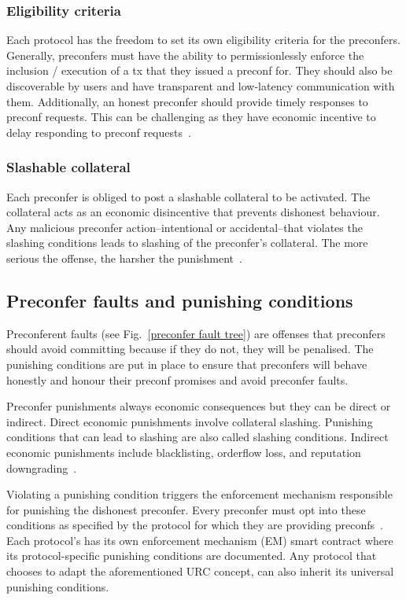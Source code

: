 \documentclass[conference]{IEEEtran}
\theoremstyle{boldstyle}
\begin{document}
        \subsubsection{Eligibility criteria}
        Each protocol has the freedom to set its own eligibility criteria for the preconfers. Generally, preconfers must have the ability to permissionlessly enforce the inclusion / execution of a tx that they issued a preconf for. They should also be discoverable by users and have transparent and low-latency communication with them. Additionally, an honest preconfer should provide timely responses to preconf requests. This can be challenging as they have economic incentive to delay responding to preconf requests~\cite{W:PreconfirmationsGlossaryRequirements}.
        
        \subsubsection{Slashable collateral}
        Each preconfer is obliged to post a slashable collateral to be activated. The collateral acts as an economic disincentive that prevents dishonest behaviour. Any malicious preconfer action--intentional or accidental--that violates the slashing conditions leads to slashing of the preconfer’s collateral. The more serious the offense, the harsher the punishment~\cite{W:Preconfirmations:Explained}.
        
    \subsection{Preconfer faults and punishing conditions} \label{Preconfer faults and punishing conditions}
Preconferent faults (see Fig.~\ref{preconfer fault tree}) are offenses that preconfers should avoid committing because if they do not, they will be penalised. The punishing conditions are put in place to ensure that preconfers will behave honestly and honour their preconf promises and avoid preconfer faults. 
    
    Preconfer punishments always economic consequences but they can be direct or indirect. Direct economic punishments involve collateral slashing. Punishing conditions that can lead to slashing are also called slashing conditions. Indirect economic punishments include blacklisting, orderflow loss, and reputation downgrading~\cite{W:PreconfirmationFairExchange}. 
    
    Violating a punishing condition triggers the enforcement mechanism responsible for punishing the dishonest preconfer. Every preconfer must opt into these conditions as specified by the protocol for which they are providing preconfs~\cite{W:Basedpreconfirmations}. Each protocol's has its own enforcement mechanism (EM) smart contract where its protocol-specific punishing conditions are documented. Any protocol that chooses to adapt the aforementioned URC concept, can also inherit its universal punishing conditions.
    
\end{document}
